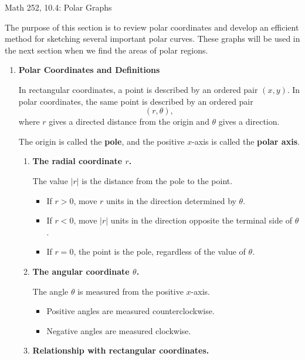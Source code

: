\documentclass[11pt,letterpaper]{article}
\begin{document}
\begin{center}
\Large Math 252, 10.4: Polar Graphs\\ \normalsize
\end{center}

The purpose of this section is to review polar coordinates and develop an efficient method for sketching several important polar curves. These graphs will be used in the next section when we find the areas of polar regions.

\begin{enumerate}

\item \textbf{Polar Coordinates and Definitions}

In rectangular coordinates, a point is described by an ordered pair $(x,y)$. In polar coordinates, the same point is described by an ordered pair
\[
(r,\theta),
\]
where $r$ gives a directed distance from the origin and $\theta$ gives a direction.

The origin is called the \textbf{pole}, and the positive $x$-axis is called the \textbf{polar axis}.

\begin{enumerate}
\item \textbf{The radial coordinate $r$.}

The value $|r|$ is the distance from the pole to the point.
\begin{itemize}
\item If $r>0$, move $r$ units in the direction determined by $\theta$.
\item If $r<0$, move $|r|$ units in the direction opposite the terminal side of $\theta$.
\item If $r=0$, the point is the pole, regardless of the value of $\theta$.
\end{itemize}

\item \textbf{The angular coordinate $\theta$.}

The angle $\theta$ is measured from the positive $x$-axis.
\begin{itemize}
\item Positive angles are measured counterclockwise.
\item Negative angles are measured clockwise.
\end{itemize}

\item \textbf{Relationship with rectangular coordinates.}


\end{enumerate}
\end{enumerate}
\end{document}
